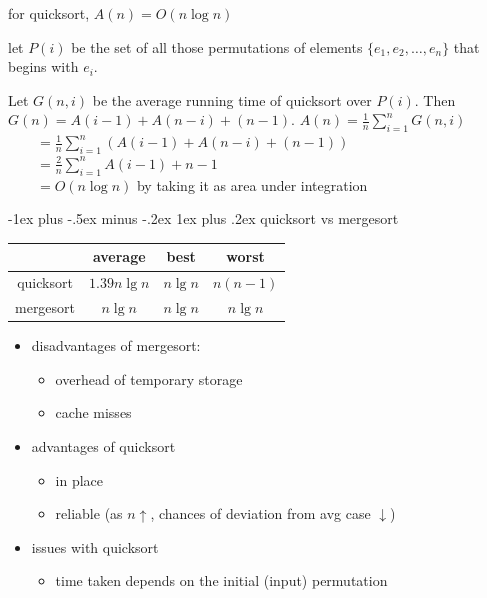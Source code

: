 \documentclass[10pt, landscape]{article}
\makeatletter
\renewcommand{\subsubsection}{\@startsection{subsubsection}{3}{0mm}%
  {-1ex plus -.5ex minus -.2ex}%
  {1ex plus .2ex}%
{\normalfont\small\bfseries}}%
\makeatother
\begin{document}
\begin{multicols*}{4}
  \begin{niceproof}
    for quicksort, $A(n) = O(n \log n)$

    let $P(i)$ be the set of all those permutations of elements $\{e_1, e_2, \dots, e_n\}$ that begins with $e_i$.

    Let $G(n, i)$ be the average running time of quicksort over $P(i)$.
    Then $G(n) = A(i-1) + A(n-i) + (n-1)$.
    $A(n) = \frac{1}{n} \sum_{i=1}^n G(n, i)$
    \\ $\quad\quad = \frac{1}{n} \sum_{i=1}^n ( A(i-1) + A(n-i) + (n-1) )$
    \\ $\quad\quad = \frac{2}{n} \sum_{i=1}^n A(i-1)+n-1$
    \\ $\quad\quad = O(n\log n)$ by taking it as area under integration
  \end{niceproof}

  \subsubsection{quicksort vs mergesort}

  \begin{center}
    \begin{tabular}{|c|c|c|c|}
      \hline
      & average & best & worst \\\hline
      quicksort & $1.39n\lg n$ &  $n \lg n$ & $n(n-1)$ \\\hline
      mergesort & $n\lg n$ &  $n \lg n$ & $n \lg n$ \\\hline
    \end{tabular}
  \end{center}

  \begin{itemize}
    \item disadvantages of mergesort:
      \begin{itemize}
        \item overhead of temporary storage
        \item cache misses
      \end{itemize}
    \item advantages of quicksort
      \begin{itemize}
        \item in place
        \item reliable (as $n \uparrow$, chances of deviation from avg case $\downarrow$)
      \end{itemize}
    \item issues with quicksort
      \begin{itemize}
        \item {} time taken depends on the initial (input) permutation
      \end{itemize}
  \end{itemize}


\end{multicols*}
\end{document}
